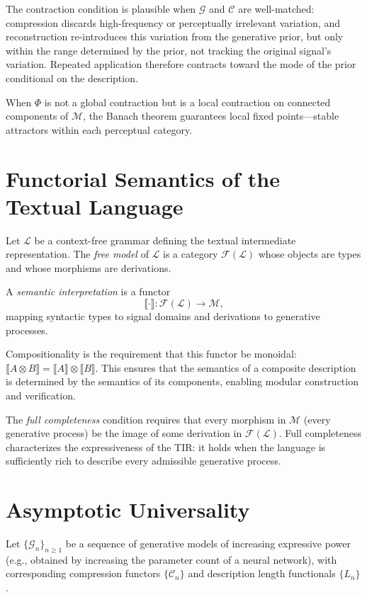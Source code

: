 \documentclass[12pt,a4paper]{article}
\theoremstyle{definition}
\theoremstyle{remark}
\begin{document}
The contraction condition is plausible when $\mathcal{G}$ and $\mathcal{C}$ are well-matched: compression discards high-frequency or perceptually irrelevant variation, and reconstruction re-introduces this variation from the generative prior, but only within the range determined by the prior, not tracking the original signal's variation. Repeated application therefore contracts toward the mode of the prior conditional on the description.

When $\Phi$ is not a global contraction but is a local contraction on connected components of $\mathcal{M}$, the Banach theorem guarantees local fixed points---stable attractors within each perceptual category.

\section{Functorial Semantics of the Textual Language}
\label{app:functorial}

Let $\mathcal{L}$ be a context-free grammar defining the textual intermediate representation. The \emph{free model} of $\mathcal{L}$ is a category $\mathcal{F}(\mathcal{L})$ whose objects are types and whose morphisms are derivations.

A \emph{semantic interpretation} is a functor
\[
\llbracket \cdot \rrbracket : \mathcal{F}(\mathcal{L}) \to \mathcal{M},
\]
mapping syntactic types to signal domains and derivations to generative processes.

Compositionality is the requirement that this functor be monoidal: $\llbracket A \otimes B \rrbracket = \llbracket A \rrbracket \otimes \llbracket B \rrbracket$. This ensures that the semantics of a composite description is determined by the semantics of its components, enabling modular construction and verification.

The \emph{full completeness} condition requires that every morphism in $\mathcal{M}$ (every generative process) be the image of some derivation in $\mathcal{F}(\mathcal{L})$. Full completeness characterizes the expressiveness of the TIR: it holds when the language is sufficiently rich to describe every admissible generative process.

\section{Asymptotic Universality}
\label{app:universality}

Let $\{\mathcal{G}_n\}_{n \ge 1}$ be a sequence of generative models of increasing expressive power (e.g., obtained by increasing the parameter count of a neural network), with corresponding compression functors $\{\mathcal{C}_n\}$ and description length functionals $\{L_n\}$.
\end{document}
